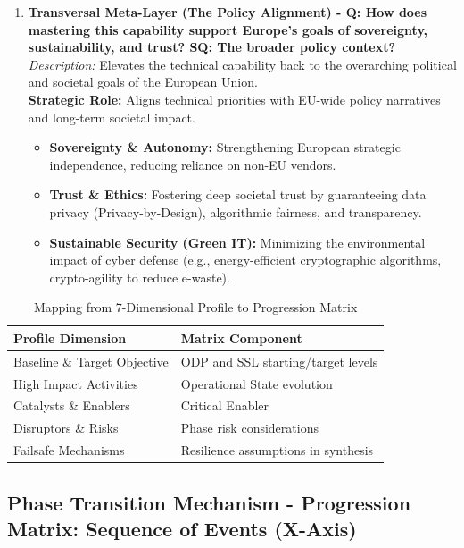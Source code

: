 \documentclass{ieeeaccess}
\begin{document}
\begin{enumerate}
    \item \textbf{Transversal Meta-Layer (The Policy Alignment) - Q: How does mastering this capability support Europe's goals of sovereignty, sustainability, and trust? SQ: The broader policy context?}\\
    \textit{Description:} Elevates the technical capability back to the overarching political and societal goals of the European Union.\\
    \textbf{Strategic Role:} Aligns technical priorities with EU-wide policy narratives and long-term societal impact.
    \begin{itemize}
        \item \textbf{Sovereignty \& Autonomy:} Strengthening European strategic independence, reducing reliance on non-EU vendors.
        \item \textbf{Trust \& Ethics:} Fostering deep societal trust by guaranteeing data privacy (Privacy-by-Design), algorithmic fairness, and transparency.
        \item \textbf{Sustainable Security (Green IT):} Minimizing the environmental impact of cyber defense (e.g., energy-efficient cryptographic algorithms, crypto-agility to reduce e-waste).
    \end{itemize}
\end{enumerate}

\begin{table}[!t]
\centering
\caption{Mapping from 7-Dimensional Profile to Progression Matrix}
\begin{tabular}{p{5cm} p{6cm}}
\toprule
\textbf{Profile Dimension} & \textbf{Matrix Component} \\
\midrule
Baseline \& Target Objective & ODP and SSL starting/target levels \\
High Impact Activities & Operational State evolution \\
Catalysts \& Enablers & Critical Enabler \\
Disruptors \& Risks & Phase risk considerations \\
Failsafe Mechanisms & Resilience assumptions in synthesis \\
\bottomrule
\end{tabular}
\end{table}

\subsection{Phase Transition Mechanism - Progression Matrix: Sequence of Events (X-Axis)}
\end{document}
